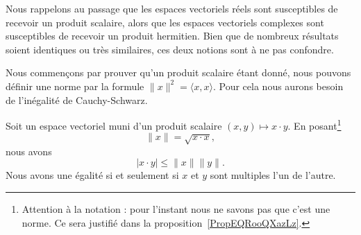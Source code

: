 Nous rappelons au passage que les espaces vectoriels réels sont susceptibles de recevoir un produit scalaire, alors que les espaces vectoriels complexes sont susceptibles de recevoir un produit hermitien. Bien que de nombreux résultats soient identiques ou très similaires, ces deux notions sont à ne pas confondre.

Nous commençons par prouver qu'un produit scalaire étant donné, nous pouvons définir une norme par la formule \( \| x \|^2=\langle x, x\rangle \). Pour cela nous aurons besoin de l'inégalité de Cauchy-Schwarz.

\begin{theorem}      \label{ThoAYfEHG}
    Soit un espace vectoriel muni d'un produit scalaire \( (x,y)\mapsto x\cdot y\). En posant\footnote{Attention à la notation : pour l'instant nous ne savons pas que c'est une norme. Ce sera justifié dans la proposition~\ref{PropEQRooQXazLz}.}
    \begin{equation}
        \| x \|=\sqrt{ x\cdot x },
    \end{equation}
    nous avons
    \begin{equation}        \label{EQooZDSHooWPcryG}
		| x\cdot y |\leq \| x \|\| y \|.
	\end{equation}
    Nous avons une égalité si et seulement si \( x\) et \( y\) sont multiples l'un de l'autre.
\end{theorem}

